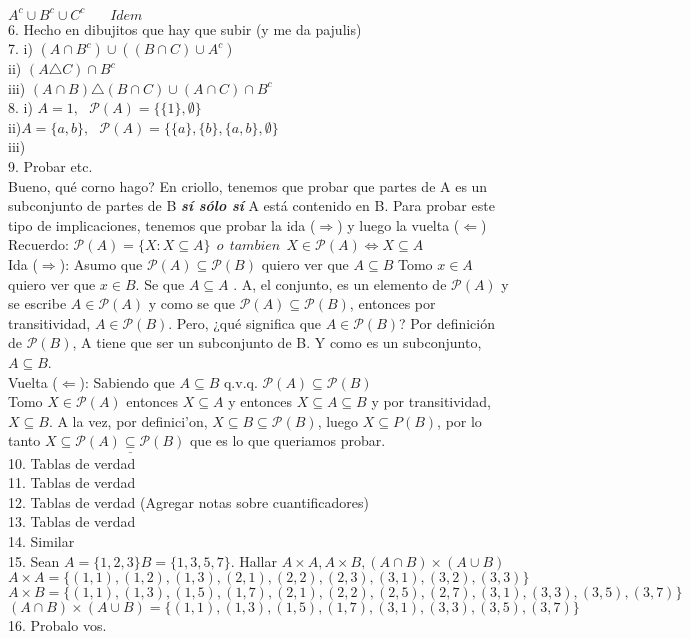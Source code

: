 \documentclass[a4paper,11pt]{article}
\begin{document}
\(A^{c}\cup B^{c}\cup C^{c}\:\:\:\:\:\:\:\:Idem\)\\
6. Hecho en dibujitos que hay que subir (y me da pajulis)\\
7. i) \((A\cap B^{c})\cup((B\cap C) \cup A^{c})\)\\
ii) \((A\triangle C)\cap B^{c}\)\\
iii) \((A\cap B)\triangle(B\cap C)\cup(A\cap C)\cap B^{c}\)\\
8. i) \(A={1},\:\:\:\mathcal{P}(A)=\{\{1\},\emptyset\}\)\\
ii)\(A=\{a,b\},\:\:\:\mathcal{P}(A)=\{\{a\},\{b\},\{a,b\},\emptyset\}\)\\
iii)\\
9. Probar etc. \\
Bueno, qué corno hago? En criollo, tenemos que probar que partes de A es un subconjunto de partes de B \textbf{\textit{sí sólo sí}} A está contenido en B. Para probar este tipo de implicaciones, tenemos que probar la ida (\(\Rightarrow\)) y luego la vuelta (\(\Leftarrow\))\\
Recuerdo: \(\mathcal{P}(A)=\{X:X\subseteq A\}\:\: o\:\:tambien\:\: X \in \mathcal{P}(A)\iff X\subseteq A\)\\
Ida (\(\Rightarrow\)): Asumo que \(\mathcal{P}(A)\subseteq \mathcal{P}(B)\) quiero ver que \(A\subseteq B \)
Tomo \(x \in A \) quiero ver que \(x \in B \). Se que \(A \subseteq A\) . A, el conjunto, es un elemento de \(\mathcal{P}(A)\) y se escribe \(A\in \mathcal{P}(A)\) y como se que \(\mathcal{P}(A)\subseteq \mathcal{P}(B)\), entonces por transitividad,  \(A\in \mathcal{P}(B)\). Pero, ¿qué significa que \(A\in \mathcal{P}(B)\)? Por definición de \(\mathcal{P}(B)\), A tiene que ser un subconjunto de B. Y como es un subconjunto,  \(A\subseteq B \).\\
Vuelta (\(\Leftarrow\)): Sabiendo que \(A\subseteq B \) q.v.q. \(\mathcal{P}(A)\subseteq \mathcal{P}(B)\) \\
Tomo \(X \in \mathcal{P}(A) \) entonces \(X \subseteq A \) y entonces \(X \subseteq A \subseteq B\) y por transitividad, \(X \subseteq B\). A la vez, por definici'on, \(X \subseteq B \subseteq \mathcal{P}(B) \), luego \(X \subseteq {P}(B) \), por lo tanto \(X \subseteq \underline{\mathcal{P}(A) \subseteq \mathcal{P}(B)} \) que es lo que queriamos probar.\\
10. Tablas de verdad\\
11. Tablas de verdad \\
12. Tablas de verdad (Agregar notas sobre cuantificadores) \\
13. Tablas de verdad \\
14. Similar \\
15. Sean \(A=\{1,2,3\} B=\{1,3,5,7\}\). Hallar \(A\times A, A\times B, (A\cap B)\times(A\cup B)\)\\
\(A \times A= \{(1,1),(1,2),(1,3),(2,1),(2,2),(2,3),(3,1),(3,2),(3,3)\} \)\\
\(A \times B= \{(1,1),(1,3),(1,5),(1,7),(2,1),(2,2),(2,5),(2,7),(3,1),(3,3),(3,5),(3,7)\} \)\\
\((A\cap B)\times(A\cup B)=\{(1,1),(1,3),(1,5),(1,7),(3,1),(3,3),(3,5),(3,7)\} \)\\
16. Probalo vos. \\
\end{document}
